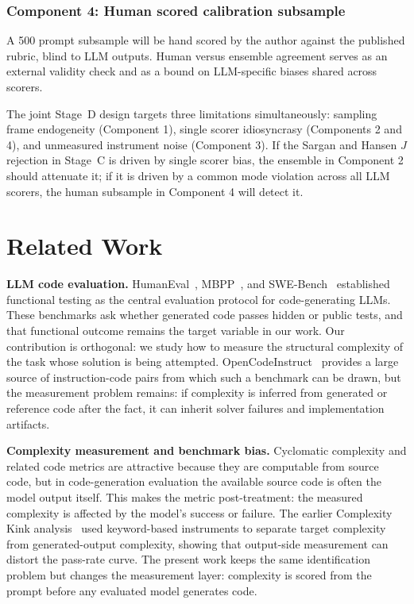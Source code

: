 \documentclass[conference]{IEEEtran}
\begin{document}
\subsubsection{Component 4: Human scored calibration subsample}
A 500 prompt subsample will be hand scored by the author against the published rubric, blind to LLM outputs. Human versus ensemble agreement serves as an external validity check and as a bound on LLM-specific biases shared across scorers.

The joint Stage~D design targets three limitations simultaneously: sampling frame endogeneity (Component 1), single scorer idiosyncrasy (Components 2 and 4), and unmeasured instrument noise (Component 3). If the Sargan and Hansen $J$ rejection in Stage~C is driven by single scorer bias, the ensemble in Component 2 should attenuate it; if it is driven by a common mode violation across all LLM scorers, the human subsample in Component 4 will detect it.

\section{Related Work}

\textbf{LLM code evaluation.} HumanEval~\cite{chen2021evaluating}, MBPP~\cite{austin2021program}, and SWE-Bench~\cite{jimenez2023swebench} established functional testing as the central evaluation protocol for code-generating LLMs. These benchmarks ask whether generated code passes hidden or public tests, and that functional outcome remains the target variable in our work. Our contribution is orthogonal: we study how to measure the structural complexity of the task whose solution is being attempted. OpenCodeInstruct~\cite{opencodeinst} provides a large source of instruction-code pairs from which such a benchmark can be drawn, but the measurement problem remains: if complexity is inferred from generated or reference code after the fact, it can inherit solver failures and implementation artifacts.

\textbf{Complexity measurement and benchmark bias.} Cyclomatic complexity and related code metrics are attractive because they are computable from source code, but in code-generation evaluation the available source code is often the model output itself. This makes the metric post-treatment: the measured complexity is affected by the model's success or failure. The earlier Complexity Kink analysis~\cite{hernandez2026complexity} used keyword-based instruments to separate target complexity from generated-output complexity, showing that output-side measurement can distort the pass-rate curve. The present work keeps the same identification problem but changes the measurement layer: complexity is scored from the prompt before any evaluated model generates code.
\end{document}
